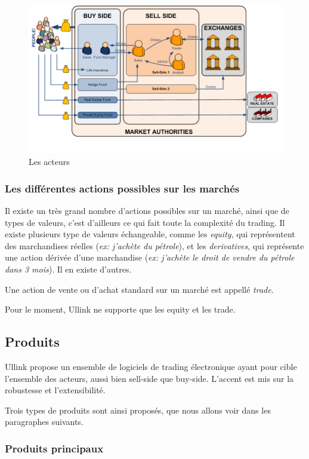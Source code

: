 \documentclass[a4paper, 12pt]{article}
\begin{document}
\begin{figure}
\includegraphics[width=\textwidth]{market_actors.png}
\caption{Les acteurs}
\label{market_actors}
\end{figure}

\subsubsection{Les différentes actions possibles sur les marchés}

Il existe un très grand nombre d'actions possibles sur un marché, ainsi que de types de valeurs, c'est d'ailleurs ce qui fait toute la complexité du trading. Il existe plusieurs type de valeurs échangeable, comme les \emph{equity}, qui représentent des marchandises réelles (\emph{ex: j'achète du pétrole}), et les \emph{derivatives}, qui représente une action dérivée d'une marchandise (\emph{ex: j'achète le droit de vendre du pétrole dans 3 mois}). Il en existe d'autres.

Une action de vente ou d'achat standard sur un marché est appellé \emph{trade}.

Pour le moment, Ullink ne supporte que les equity et les trade.

\subsection{Produits}

Ullink propose un ensemble de logiciels de trading électronique ayant pour cible l'ensemble des acteurs, aussi bien sell-side que buy-side. L'accent est mis sur la robustesse et l'extensibilité.

Trois types de produits sont ainsi proposés, que nous allons voir dans les paragraphes suivants.

\subsubsection{Produits principaux}
\end{document}
